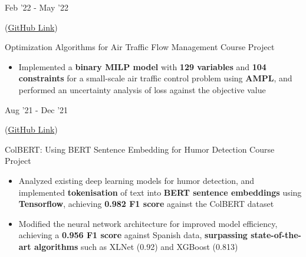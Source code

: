 \documentclass[9pt]{developercv}
\begin{document}
\begin{entrylist}
    \entry
        {Feb '22 - May '22 \newline\newline \vspace{-15pt}
        
        (\href{https://github.com/omprabhu31/iitb-projects/tree/main/me308}{GitHub Link})}
		{Optimization Algorithms for Air Traffic Flow Management}
		{Course Project}
		{\vspace{-9.5pt}
        \begin{itemize}[noitemsep, topsep=0pt, parsep=0pt, partopsep=0pt, leftmargin=9pt]
            \item Implemented a \textbf{binary MILP model} with \textbf{129 variables} and \textbf{104 constraints} for a small-scale air traffic control problem using \textbf{AMPL}, and performed an uncertainty analysis of loss against the objective value
        \end{itemize}}
    \entry
        {Aug '21 - Dec '21 \newline\newline \vspace{-15pt}
        
        (\href{https://github.com/omprabhu31/iitb-projects/tree/main/ie643}{GitHub Link})}
		{ColBERT: Using BERT Sentence Embedding for Humor Detection}
		{Course Project}
		{\vspace{-9pt}
        \begin{itemize}[noitemsep, topsep=0pt, parsep=0pt, partopsep=0pt, leftmargin=9pt]
            \item Analyzed existing deep learning models for humor detection, and implemented \textbf{tokenisation} of text into \textbf{BERT sentence embeddings} using \textbf{Tensorflow}, achieving \textbf{0.982 F1 score} against the ColBERT dataset
            \vspace{2.5pt}
            
            \item Modified the neural network architecture for improved model efficiency, achieving a \textbf{0.956 F1 score} against Spanish data, \textbf{surpassing state-of-the-art algorithms} such as XLNet (0.92) and XGBoost (0.813)
        \end{itemize}}
\end{entrylist}

\vspace{-15 pt}
\vspace{-2.5pt}
\end{document}
